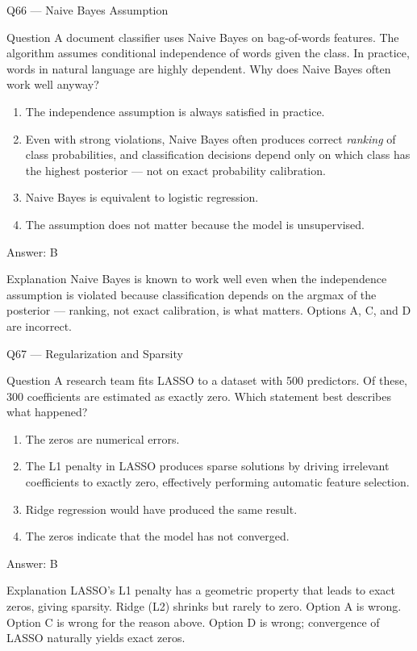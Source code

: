 \documentclass[aspectratio=169,8pt]{beamer}
\begin{document}
	\begin{frame}{Q66 --- Naive Bayes Assumption}
		\begin{block}{Question}
			A document classifier uses Naive Bayes on bag-of-words features. The algorithm assumes conditional independence of words given the class. In practice, words in natural language are highly dependent. Why does Naive Bayes often work well anyway?
		\end{block}
		\begin{enumerate}
			\item The independence assumption is always satisfied in practice.
			\item Even with strong violations, Naive Bayes often produces correct \emph{ranking} of class probabilities, and classification decisions depend only on which class has the highest posterior --- not on exact probability calibration.
			\item Naive Bayes is equivalent to logistic regression.
			\item The assumption does not matter because the model is unsupervised.
		\end{enumerate}
		\begin{exampleblock}{Answer: B}\end{exampleblock}
		\begin{block}{Explanation}
			Naive Bayes is known to work well even when the independence assumption is violated because classification depends on the argmax of the posterior --- ranking, not exact calibration, is what matters. Options A, C, and D are incorrect.
		\end{block}
	\end{frame}
	
	\begin{frame}{Q67 --- Regularization and Sparsity}
		\begin{block}{Question}
			A research team fits LASSO to a dataset with 500 predictors. Of these, 300 coefficients are estimated as exactly zero. Which statement best describes what happened?
		\end{block}
		\begin{enumerate}
			\item The zeros are numerical errors.
			\item The L1 penalty in LASSO produces sparse solutions by driving irrelevant coefficients to exactly zero, effectively performing automatic feature selection.
			\item Ridge regression would have produced the same result.
			\item The zeros indicate that the model has not converged.
		\end{enumerate}
		\begin{exampleblock}{Answer: B}\end{exampleblock}
		\begin{block}{Explanation}
			LASSO's L1 penalty has a geometric property that leads to exact zeros, giving sparsity. Ridge (L2) shrinks but rarely to zero. Option A is wrong. Option C is wrong for the reason above. Option D is wrong; convergence of LASSO naturally yields exact zeros.
		\end{block}
	\end{frame}
	
\end{document}
